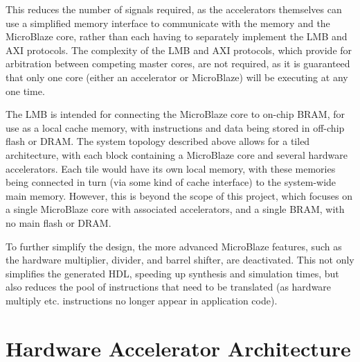 \documentclass{UoYCSproject}
\begin{document}
This reduces the number of signals required, as the accelerators themselves can use a simplified memory interface to communicate
with the memory and the MicroBlaze core, rather than each having to separately implement the LMB and AXI protocols.
The complexity of the LMB and AXI protocols, which provide for arbitration between competing master cores, are not required,
as it is guaranteed that only one core (either an accelerator or MicroBlaze) will be executing at any one time.

The LMB is intended for connecting the MicroBlaze core to on-chip BRAM, for use as a local cache memory, with instructions
and data being stored in off-chip flash or DRAM. The system topology described above allows for a tiled architecture,
with each block containing a MicroBlaze core and several hardware accelerators. Each tile would have its own local memory,
with these memories being connected in turn (via some kind of cache interface) to the system-wide main memory. However,
this is beyond the scope of this project, which focuses on a single MicroBlaze core with associated accelerators,
and a single BRAM, with no main flash or DRAM.

To further simplify the design, the more advanced MicroBlaze features, such as the hardware multiplier, divider, and barrel
shifter, are deactivated. This not only simplifies the generated HDL, speeding up synthesis and simulation times, but also
reduces the pool of instructions that need to be translated (as hardware multiply etc. instructions no longer appear in
application code).

\section{Hardware Accelerator Architecture}
\end{document}
